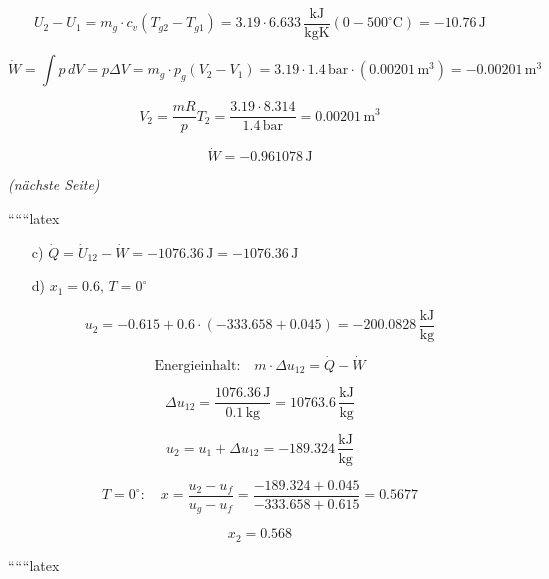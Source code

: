 \[
U_2 - U_1 = m_g \cdot c_v (T_{g2} - T_{g1}) = 3.19 \cdot 6.633 \, \frac{\text{kJ}}{\text{kgK}} (0 - 500^\circ \text{C}) = - 10.76 \, \text{J}
\]

\[
\dot{W} = \int p \, dV = p \Delta V = m_g \cdot p_g (V_2 - V_1) = 3.19 \cdot 1.4 \, \text{bar} \cdot (0.00201 \, \text{m}^3) = -0.00201 \, \text{m}^3
\]

\[
V_2 = \frac{mR}{p} T_2 = \frac{3.19 \cdot 8.314}{1.4 \, \text{bar}} = 0.00201 \, \text{m}^3
\]

\[
\dot{W} = -0.961078 \, \text{J}
\]

\textit{(nächste Seite)}

``````latex


\begin{itemize}
    \item[c)] $\dot{Q} = \dot{U}_{12} - \dot{W} = -1076.36 \, \text{J} = -1076.36 \, \text{J}$
\end{itemize}

\begin{itemize}
    \item[d)] $x_1 = 0.6, \, T = 0^\circ$
\end{itemize}

\[
u_2 = -0.615 + 0.6 \cdot (-333.658 + 0.045) = -200.0828 \, \frac{\text{kJ}}{\text{kg}}
\]

\[
\text{Energieinhalt:} \quad m \cdot \Delta u_{12} = \dot{Q} - \dot{W}
\]

\[
\Delta u_{12} = \frac{1076.36 \, \text{J}}{0.1 \, \text{kg}} = 10763.6 \, \frac{\text{kJ}}{\text{kg}}
\]

\[
u_2 = u_1 + \Delta u_{12} = -189.324 \, \frac{\text{kJ}}{\text{kg}}
\]

\[
T = 0^\circ: \quad x = \frac{u_2 - u_f}{u_g - u_f} = \frac{-189.324 + 0.045}{-333.658 + 0.615} = 0.5677
\]

\[
x_2 = 0.568
\]

``````latex


